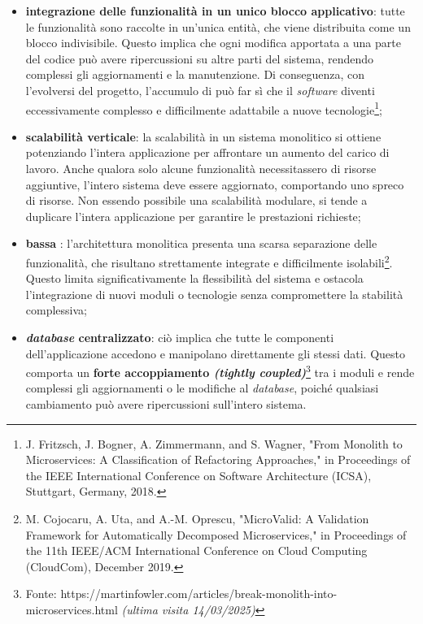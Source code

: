             \begin{itemize}
                \item \textbf{integrazione delle funzionalità in un unico blocco applicativo}: tutte le funzionalità sono raccolte in un’unica entità, che viene distribuita come un blocco indivisibile. Questo implica che ogni modifica apportata a una parte del codice può avere ripercussioni su altre parti del sistema, rendendo complessi gli aggiornamenti e la manutenzione. Di conseguenza, con l’evolversi del progetto, l’accumulo di  può far sì che il \textit{software} diventi eccessivamente complesso e difficilmente adattabile a nuove tecnologie\footnote{J. Fritzsch, J. Bogner, A. Zimmermann, and S. Wagner, "From Monolith to Microservices: A Classification of Refactoring Approaches," in Proceedings of the IEEE International Conference on Software Architecture (ICSA), Stuttgart, Germany, 2018.};
                \item  \textbf{scalabilità verticale}: la scalabilità in un sistema monolitico si ottiene potenziando l’intera applicazione per affrontare un aumento del carico di lavoro. Anche qualora solo alcune funzionalità necessitassero di risorse aggiuntive, l’intero sistema deve essere aggiornato, comportando uno spreco di risorse. Non essendo possibile una scalabilità modulare, si tende a duplicare l’intera applicazione per garantire le prestazioni richieste;
                \item \textbf{bassa} : l’architettura monolitica presenta una scarsa separazione delle funzionalità, che risultano strettamente integrate e difficilmente isolabili\footnote{M. Cojocaru, A. Uta, and A.-M. Oprescu, "MicroValid: A Validation Framework for Automatically Decomposed Microservices," in Proceedings of the 11th IEEE/ACM International Conference on Cloud Computing (CloudCom), December 2019.}. Questo limita significativamente la flessibilità del sistema e ostacola l’integrazione di nuovi moduli o tecnologie senza compromettere la stabilità complessiva; 
                \item \textbf{\textit{database} centralizzato}: ciò implica che tutte le componenti dell’applicazione accedono e manipolano direttamente gli stessi dati. Questo comporta un \textbf{forte accoppiamento \textit{(tightly coupled)}}\footnote{Fonte: https://martinfowler.com/articles/break-monolith-into-microservices.html \textit{(ultima visita 14/03/2025)}} tra i moduli e rende complessi gli aggiornamenti o le modifiche al \textit{database}, poiché qualsiasi cambiamento può avere ripercussioni sull’intero sistema.
            \end{itemize}  

